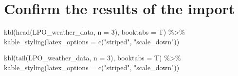 \documentclass[
  11pt,
]{article}
\newenvironment{Shaded}{\begin{snugshade}}{\end{snugshade}}
\newcommand{\AttributeTok}[1]{\textcolor[rgb]{0.77,0.63,0.00}{#1}}
\newcommand{\DecValTok}[1]{\textcolor[rgb]{0.00,0.00,0.81}{#1}}
\newcommand{\FunctionTok}[1]{\textcolor[rgb]{0.00,0.00,0.00}{#1}}
\newcommand{\NormalTok}[1]{#1}
\newcommand{\SpecialCharTok}[1]{\textcolor[rgb]{0.00,0.00,0.00}{#1}}
\newcommand{\StringTok}[1]{\textcolor[rgb]{0.31,0.60,0.02}{#1}}
\begin{document}
\hypertarget{confirm-the-results-of-the-import}{%
\section{Confirm the results of the
import}\label{confirm-the-results-of-the-import}}

\begin{Shaded}
\begin{Highlighting}[]
\FunctionTok{kbl}\NormalTok{(}\FunctionTok{head}\NormalTok{(LPO\_weather\_data, }\AttributeTok{n =} \DecValTok{3}\NormalTok{), }\AttributeTok{booktabs =}\NormalTok{ T) }\SpecialCharTok{\%\textgreater{}\%} 
  \FunctionTok{kable\_styling}\NormalTok{(}\AttributeTok{latex\_options =} \FunctionTok{c}\NormalTok{(}\StringTok{"striped"}\NormalTok{, }\StringTok{"scale\_down"}\NormalTok{))}
\end{Highlighting}
\end{Shaded}

\begin{table}
\centering
{}
\end{table}

\begin{Shaded}
\begin{Highlighting}[]
\FunctionTok{kbl}\NormalTok{(}\FunctionTok{tail}\NormalTok{(LPO\_weather\_data, }\AttributeTok{n =} \DecValTok{3}\NormalTok{), }\AttributeTok{booktabs =}\NormalTok{ T) }\SpecialCharTok{\%\textgreater{}\%} 
  \FunctionTok{kable\_styling}\NormalTok{(}\AttributeTok{latex\_options =} \FunctionTok{c}\NormalTok{(}\StringTok{"striped"}\NormalTok{, }\StringTok{"scale\_down"}\NormalTok{))}
\end{Highlighting}
\end{Shaded}
\end{document}

